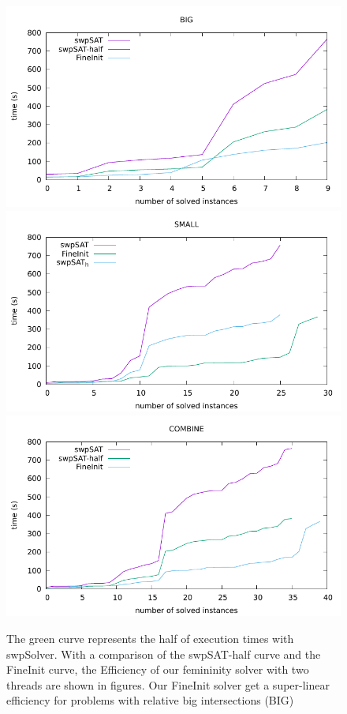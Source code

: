 \documentclass[12pt,a4paper,twoside]{scrartcl}
\numberwithin{equation}{section}
\begin{document}
 \begin{figure}[H]
\begin{center}
  \includegraphics[scale = 1]{DATA/BIG/a4.pdf}
    \includegraphics[scale = 1]{DATA/SMALL/a4.pdf}
    \includegraphics[scale = 1]{DATA/COMBINE/a4.pdf}
  \end{center}
  \caption{The green curve represents the half of execution times with swpSolver. With a comparison of the swpSAT-half curve and the FineInit curve, the Efficiency of our femininity solver with two threads are shown in figures. Our FineInit solver get a super-linear efficiency for problems with relative big intersections (BIG)}
  \label{Experiment 6 COMBINE}
  \end{figure} 
\clearpage
\end{document}
